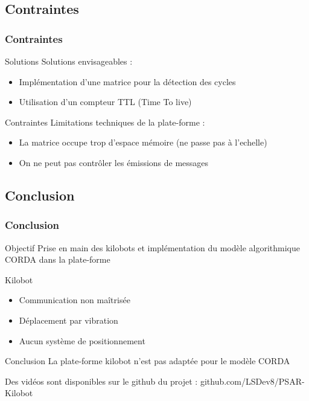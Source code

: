 \documentclass[xcolor=table]{beamer}
\begin{document}
\subsection{Contraintes}
\begin{frame}
  \frametitle{Contraintes}
  \begin{block}{Solutions}
    Solutions envisageables : \\
    \begin{itemize}
      [triangle]
    \item Implémentation d'une matrice pour la détection des cycles
    \item Utilisation d'un compteur TTL (Time To live)
    \end{itemize}
  \end{block}
  \pause
  \begin{block}{Contraintes}
    Limitations techniques de la plate-forme :\\
    \begin{itemize}
      [triangle]
    \item La matrice occupe trop d'espace mémoire (ne passe pas à l'echelle)
    \item On ne peut pas contrôler les émissions de messages
    \end{itemize}
  \end{block}
\end{frame}


\subsection{Conclusion}
\begin{frame}
  \frametitle{Conclusion}
  \begin{block}{Objectif}
    Prise en main des kilobots et implémentation du modèle algorithmique CORDA dans la plate-forme
  \end{block}
  \begin{block}{Kilobot}
    \begin{itemize}
      [triangle]
    \item Communication non maîtrisée
    \item D\'eplacement par vibration
    \item Aucun système de positionnement
    \end{itemize}
  \end{block}
  \begin{block}{Conclusion}
    La plate-forme kilobot n'est pas adaptée pour le modèle CORDA
  \end{block}
  Des vidéos sont disponibles sur le github du projet : github.com/LSDev8/PSAR-Kilobot
\end{frame}
\end{document}
